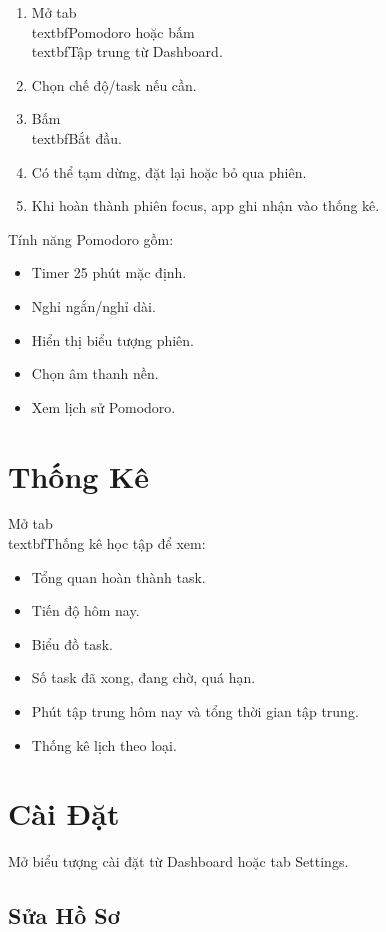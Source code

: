 \documentclass[12pt,a4paper]{report}
\begin{document}
\begin{enumerate}
\item Mở tab \\textbf{Pomodoro} hoặc bấm \\textbf{Tập trung} từ Dashboard.
\item Chọn chế độ/task nếu cần.
\item Bấm \\textbf{Bắt đầu}.
\item Có thể tạm dừng, đặt lại hoặc bỏ qua phiên.
\item Khi hoàn thành phiên focus, app ghi nhận vào thống kê.
\end{enumerate}

Tính năng Pomodoro gồm:

\begin{itemize}
\item Timer 25 phút mặc định.
\item Nghỉ ngắn/nghỉ dài.
\item Hiển thị biểu tượng phiên.
\item Chọn âm thanh nền.
\item Xem lịch sử Pomodoro.
\end{itemize}

\section{Thống Kê}

Mở tab \\textbf{Thống kê học tập} để xem:

\begin{itemize}
\item Tổng quan hoàn thành task.
\item Tiến độ hôm nay.
\item Biểu đồ task.
\item Số task đã xong, đang chờ, quá hạn.
\item Phút tập trung hôm nay và tổng thời gian tập trung.
\item Thống kê lịch theo loại.
\end{itemize}

\section{Cài Đặt}

Mở biểu tượng cài đặt từ Dashboard hoặc tab Settings.

\subsection{Sửa Hồ Sơ}
\end{document}

